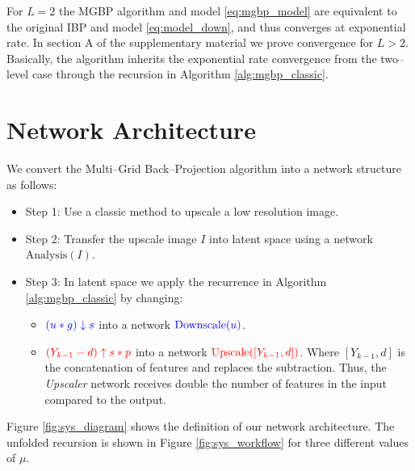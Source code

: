 \documentclass[letterpaper]{article}
\begin{document}
For $L=2$ the MGBP algorithm and model \eqref{eq:mgbp_model} are equivalent to the original IBP \cite{Irani_1991a} and model \eqref{eq:model_down}, and thus converges at exponential rate. In section A of the supplementary material we prove convergence for $L>2$. Basically, the algorithm inherits the exponential rate convergence from the two--level case through the recursion in Algorithm \ref{alg:mgbp_classic}.

\section{Network Architecture}
\label{sec:network}
We convert the Multi--Grid Back--Projection algorithm into a network structure as follows:
\begin{itemize}
    \item Step 1: Use a classic method to upscale a low resolution image.
    \item Step 2: Transfer the upscale image $I$ into latent space using a network $\text{Analysis}(I)$.
    \item Step 3: In latent space we apply the recurrence in Algorithm \ref{alg:mgbp_classic} by changing:
    \begin{itemize}
        \item ${\color{blue}(u * g)\downarrow s}$ into a network ${\color{blue}\text{Downscale}(u)}$.
        \item ${\color{red}(Y_{k-1} - d)\uparrow s * p}$ into a network ${\color{red}\text{Upscale}(\left[Y_{k-1}, d\right])}$. Where $\left[Y_{k-1}, d\right]$ is the concatenation of features and replaces the subtraction. Thus, the \emph{Upscaler} network receives double the number of features in the input compared to the output.
    \end{itemize}
\end{itemize}
Figure \ref{fig:sys_diagram} shows the definition of our network architecture. The unfolded recursion is shown in Figure \ref{fig:sys_workflow} for three different values of $\mu$.
\end{document}
